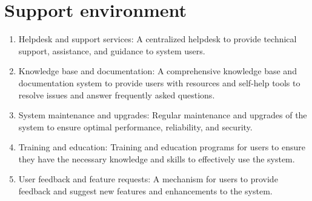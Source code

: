 \section{Support environment \label{Section::Supportenvironment}}

\begin{enumerate}
    \item Helpdesk and support services: A centralized helpdesk to provide technical support, assistance, and guidance to system users.

    \item Knowledge base and documentation: A comprehensive knowledge base and documentation system to provide users with resources and self-help tools to resolve issues and answer frequently asked questions.

    \item System maintenance and upgrades: Regular maintenance and upgrades of the system to ensure optimal performance, reliability, and security.

    \item Training and education: Training and education programs for users to ensure they have the necessary knowledge and skills to effectively use the system.

    \item User feedback and feature requests: A mechanism for users to provide feedback and suggest new features and enhancements to the system.
\end{enumerate}
\newpage